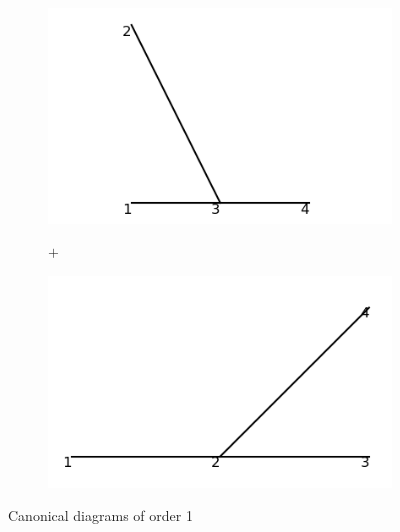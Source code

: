 \documentclass[11pt,a4paper,twoside,pdf]{article}
\numberwithin{equation}{section}
\begin{document}
\begin{figure}[h!]
    \centering
    \begin{subfigure}[t]{0.33\textwidth}
        \centering
        \includegraphics[width=\textwidth]{plots/canonical/order1/1.png}
        \caption{ }
    \end{subfigure}%
    \begin{subfigure}[t]{0.1\textwidth}
        \centering
        {\LARGE $+$}
    \end{subfigure}
    \begin{subfigure}[t]{0.33\textwidth}
        \centering
        \includegraphics[width=\textwidth]{plots/canonical/order1/2.png}
        \caption{ }
    \end{subfigure}
    \caption{Canonical diagrams of order 1}
    \label{fig:cannonical1}
\end{figure}
\end{document}
